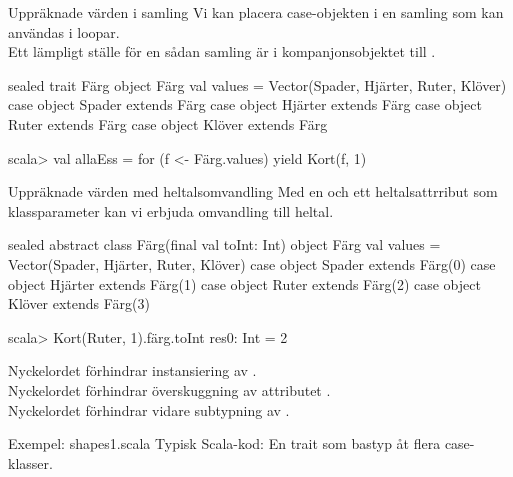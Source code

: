 \begin{Slide}{Uppräknade värden i samling}\SlideFontSmall
Vi kan placera case-objekten i en samling som kan användas i loopar. \\ Ett lämpligt ställe för en sådan samling är i kompanjonsobjektet till .
\begin{Code}
sealed trait Färg
object Färg {
  val values = Vector(Spader, Hjärter, Ruter, Klöver)
}
case object Spader extends Färg
case object Hjärter extends Färg
case object Ruter extends Färg
case object Klöver extends Färg
\end{Code}

\begin{REPL}
scala> val allaEss = for (f <- Färg.values) yield Kort(f, 1)
\end{REPL}
\end{Slide}


\begin{Slide}{Uppräknade värden med heltalsomvandling}\SlideFontSmall
Med en  och ett heltalsattrribut  som klassparameter kan vi erbjuda omvandling till heltal.
\begin{Code}
sealed abstract class Färg(final val toInt: Int)
object Färg {
  val values = Vector(Spader, Hjärter, Ruter, Klöver)
}
case object Spader  extends Färg(0)
case object Hjärter extends Färg(1)
case object Ruter   extends Färg(2)
case object Klöver  extends Färg(3)
\end{Code}

\begin{REPL}
scala> Kort(Ruter, 1).färg.toInt
res0: Int = 2
\end{REPL}
Nyckelordet  förhindrar instansiering av . \\
Nyckelordet  förhindrar överskuggning av attributet . \\
Nyckelordet  förhindrar vidare subtypning av .
\end{Slide}





\begin{Slide}{Exempel: shapes1.scala}
Typisk Scala-kod: En trait som bastyp åt flera case-klasser.
\end{Slide}

